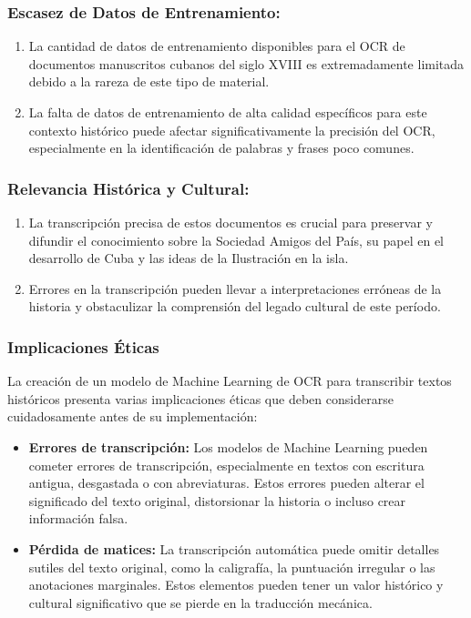 \documentclass{article}
\begin{document}
\subsubsection{Escasez de Datos de Entrenamiento:}
\begin{enumerate}
    \item La cantidad de datos de entrenamiento disponibles para el OCR de documentos manuscritos cubanos del siglo XVIII es extremadamente limitada debido a la rareza de este tipo de material.
    \item La falta de datos de entrenamiento de alta calidad específicos para este contexto histórico puede afectar significativamente la precisión del OCR, especialmente en la identificación de palabras y frases poco comunes.
\end{enumerate}

\subsubsection{Relevancia Histórica y Cultural:}
\begin{enumerate}
    \item La transcripción precisa de estos documentos es crucial para preservar y difundir el conocimiento sobre la Sociedad Amigos del País, su papel en el desarrollo de Cuba y las ideas de la Ilustración en la isla.
    \item Errores en la transcripción pueden llevar a interpretaciones erróneas de la historia y obstaculizar la comprensión del legado cultural de este período.
\end{enumerate}

\subsubsection{Implicaciones Éticas}

La creación de un modelo de Machine Learning de OCR para transcribir textos históricos presenta varias implicaciones éticas que deben considerarse cuidadosamente antes de su implementación:

\begin{itemize}
    \item \textbf{Errores de transcripción:} Los modelos de Machine Learning pueden cometer errores de transcripción, especialmente en textos con escritura antigua, desgastada o con abreviaturas. Estos errores pueden alterar el significado del texto original, distorsionar la historia o incluso crear información falsa.

    \item \textbf{Pérdida de matices:} La transcripción automática puede omitir detalles sutiles del texto original, como la caligrafía, la puntuación irregular o las anotaciones marginales. Estos elementos pueden tener un valor histórico y cultural significativo que se pierde en la traducción mecánica.
\end{itemize}
\end{document}
